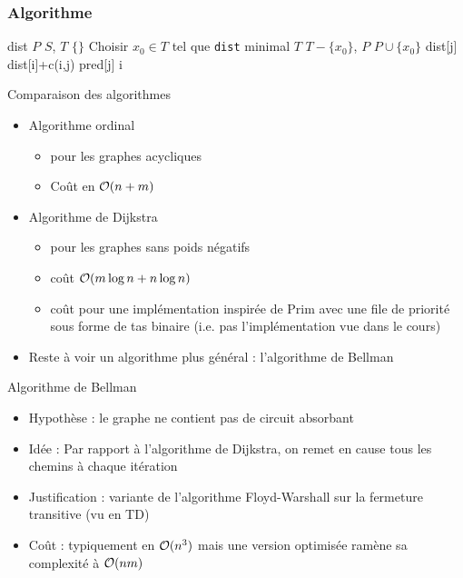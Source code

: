 \begin{frame}[fragile]
    \frametitle{Algorithme}
    \begin{algorithmic}[1]
            \State dist 
            \State $P$ \gets $S$, $T$ \gets $\{\}$
                \State Choisir $x_0 \in T$ tel que \texttt{dist} minimal
                \State $T$ \gets $T-\{ x_0 \}$, $P$ \gets $P \cup \{ x_0 \}$  
                        \State dist[j] \gets dist[i]+c(i,j)
                        \State pred[j] \gets i
                    \EndIf 
                \EndFor
            \EndWhile
        \EndFunction
    \end{algorithmic}
\end{frame}





\begin{frame}{Comparaison des algorithmes}
    \begin{itemize}
        \item Algorithme ordinal 
        \begin{itemize}
            \item pour les graphes acycliques 
            \item Coût en ${\cal O}(n+m)$
        \end{itemize}
        \item Algorithme de Dijkstra 
        \begin{itemize}
            \item pour les graphes sans poids négatifs 
            \item coût ${\cal O}(m \log n + n \log n)$
            \item coût pour une implémentation inspirée de Prim avec une file de priorité sous forme de tas binaire (i.e. pas l'implémentation vue dans le cours)
        \end{itemize}
        \item Reste à voir un algorithme plus général : l'algorithme de Bellman 
    \end{itemize}
\end{frame}


\begin{frame}{Algorithme de Bellman}
    \begin{itemize}
        \item Hypothèse : le graphe ne contient pas de circuit absorbant
        \item Idée : Par rapport à l'algorithme de Dijkstra, on remet en cause tous les chemins à chaque itération 
        \item Justification : variante de l'algorithme Floyd-Warshall sur la fermeture transitive (vu en TD)
        \item Coût : typiquement en ${\cal O}(n^3)$ mais une version optimisée ramène sa complexité à ${\cal O}(nm)$
    \end{itemize}
\end{frame}

